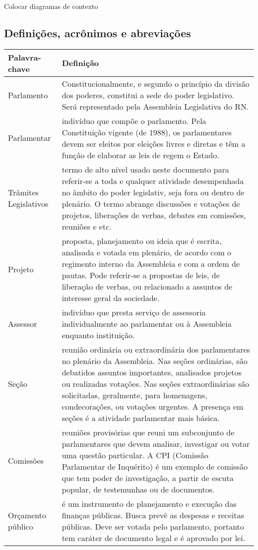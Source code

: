 \documentclass[12pt, a4paper]{article}
\begin{document}
        {\color{red} Colocar diagramas de contexto}

        \subsection{Definições, acrônimos e abreviações}
         \begin{tabu}{X | X}
                \hline
                \textbf{Palavra-chave} &
                \textbf{Definição}
                \\ \hline
                Parlamento &
                Constitucionalmente, e segundo o princípio da divisão dos poderes, constitui a sede do poder legislativo. Será representado pela Assembleia Legislativa do RN.
                \\ \hline
                Parlamentar & indivíduo que compõe o parlamento. Pela Constituição vigente (de 1988), os parlamentares devem ser eleitos por eleições livres e diretas e têm a função de elaborar as leis de regem o Estado.
                \\ \hline
Trâmites Legislativos & termo de alto nível usado neste documento para referir-se a toda e qualquer atividade desempenhada no âmbito do poder legislativ, seja fora ou dentro de plenário. O termo abrange discussões e votações de projetos, liberações de verbas, debates em comissões, reuniões e etc. 
                \\ \hline
Projeto & proposta, planejamento ou ideia que é escrita, analisada e votada em plenário, de acordo com o regimento interno da Assembleia e com a ordem de pautas. Pode referir-se a propostas de leis, de liberação de verbas, ou relacionado a assuntos de interesse geral da sociedade. 
                \\ \hline
Assessor & indivíduo que presta serviço de assessoria individualmente ao parlamentar ou à Assembleia enquanto instituição. 
                \\ \hline
Seção & reunião ordinária ou extraordinária dos parlamentares no plenário da Assembleia. Nas seções ordinárias, são debatidos assuntos importantes, analisados projetos ou realizadas votações. Nas seções extraordinárias são solicitadas, geralmente, para homenagens, condecorações, ou votações urgentes. A presença em seções é a atividade parlamentar mais básica.
                \\ \hline

Comissões & reuniões provisórias que reuni um subconjunto de parlamentares que devem analisar, investigar ou votar uma questão particular. A CPI (Comissão Parlamentar de Inquérito) é um exemplo de comissão que tem poder de investigação, a partir de escuta popular, de testemunhas ou de documentos. 
                \\ \hline
Orçamento público & é um instrumento de planejamento e execução das finanças públicas. Busca prevê as despesas e receitas públicas. Deve ser votada pelo parlamento, portanto tem caráter de documento legal e é aprovado por lei. 
                \\ \hline
            \end{tabu}
        
\end{document}
